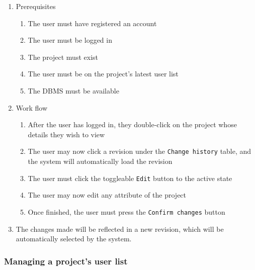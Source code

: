\documentclass{report}
\begin{document}
	\begin{enumerate}
		\item Prerequisites
		\begin{enumerate}
			\item The user must have registered an account
			\item The user must be logged in
			\item The project must exist 
			\item The user must be on the project's latest user list
			\item The DBMS must be available
		\end{enumerate}
		\item Work flow
		\begin{enumerate}
			\item After the user has logged in, they double-click on the project whose details they wish
					  to view
			\item The user may now click a revision under the \verb|Change history| table, and the system
					  will automatically load the revision
			\item The user must click the toggleable \verb|Edit| button to the active state
			\item The user may now edit any attribute of the project
			\item Once finished, the user must press the \verb|Confirm changes| button
		\end{enumerate}
		\item The changes made will be reflected in a new revision, which will be automatically selected
				  by the system.
	\end{enumerate}	
	
	\subsubsection{Managing a project's user list}
	
\end{document}

